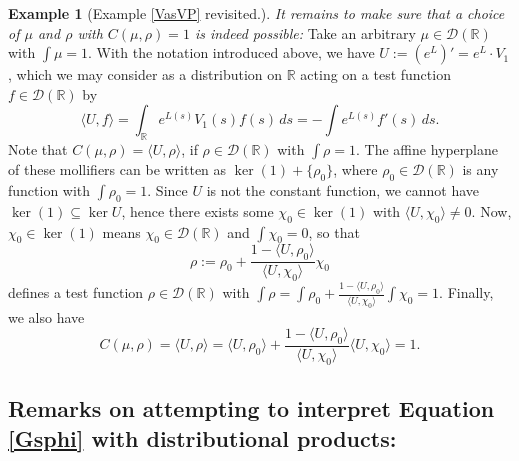 \documentclass[sumlimits,intlimits,namelimits%
]{amsart}
\newcommand{\D}{\ensuremath{\mathcal{D}}}
\newcommand{\mb}[1]{\ensuremath{\mathbb{#1}}}
\newcommand{\R}{\mb{R}}
\theoremstyle{definition}
\newtheorem{example}[theorem]{Example}
\newcommand{\todo}[1]{$\clubsuit$ \texttt{#1} $\clubsuit$}
\newcommand{\dis}[2]{\langle #1 , #2 \rangle}
\newcommand{\eps}{\varepsilon}
\newcommand{\vphi}{\varphi}
\begin{document}
\begin{example}[Example \ref{VasVP} revisited.]
\emph{It remains to make sure that a choice of $\mu$ and $\rho$ with $C(\mu,\rho) = 1$ is indeed possible:} Take an arbitrary $\mu \in \D(\R)$ with $\int \mu = 1$. With the notation introduced above, we have $U := (e^L)' = e^L \cdot V_1$, which we may consider as a distribution on $\R$ acting on a test function $f \in \D(\R)$ by 
$$
    \dis{U}{f} = \int_\R e^{L(s)} V_1(s) f(s) \, ds = - \int e^{L(s)} f'(s) \, ds.
$$
Note that $C(\mu,\rho) = \dis{U}{\rho}$, if $\rho \in \D(\R)$ with $\int \rho =1$.
The affine hyperplane of these mollifiers  can be written as $\ker(1) + \{ \rho_0\}$, where $\rho_0 \in \D(\R)$ is any function with $\int \rho _0 = 1$. Since $U$ is not the constant function, we cannot have $\ker(1) \subseteq \ker U$, hence there exists some $\chi_0 \in \ker(1)$ with $\dis{U}{\chi_0} \neq 0$. Now, $\chi_0 \in \ker(1)$ means $\chi_0 \in \D(\R)$ and $\int \chi_0 = 0$, so that 
$$
   \rho := \rho_0 + \frac{1 - \dis{U}{\rho_0}}{\dis{U}{\chi_0}} \chi_0
$$
defines a test function $\rho \in \D(\R)$ with $\int \rho =  \int \rho_0 + \frac{1 - \dis{U}{\rho_0}}{\dis{U}{\chi_0}} \int \chi_0 = 1$. Finally, we also have
$$
   C(\mu,\rho) = \dis{U}{\rho} = \dis{U}{\rho_0} +  \frac{1 - \dis{U}{\rho_0}}{\dis{U}{\chi_0}} \dis{U}{\chi_0} = 1.
$$

\end{example}



%
%

\subsection{Remarks on attempting to interpret Equation \eqref{Gsphi} with distributional products:}\label{ODE_DP}\label{IntUps}
\end{document}
